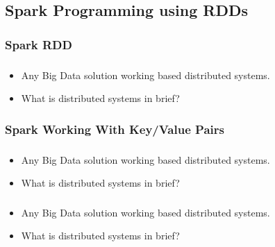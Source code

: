 \subsection{Spark Programming using RDDs}
\subsubsection{Spark RDD}

\begin{frame}
  \frametitle{\subsecname}
	\begin{itemize} 
		\item Any Big Data solution working based distributed systems.
		\item What is distributed systems in brief?
	\end{itemize}
\end{frame}

\subsubsection{Spark Working With Key/Value Pairs}

\begin{frame}
  \frametitle{\subsecname}
	\begin{itemize} 
		\item Any Big Data solution working based distributed systems.
		\item What is distributed systems in brief?
	\end{itemize}
\end{frame}



\begin{frame}
  \frametitle{\subsecname}
	\begin{itemize} 
		\item Any Big Data solution working based distributed systems.
		\item What is distributed systems in brief?
	\end{itemize}
\end{frame}


